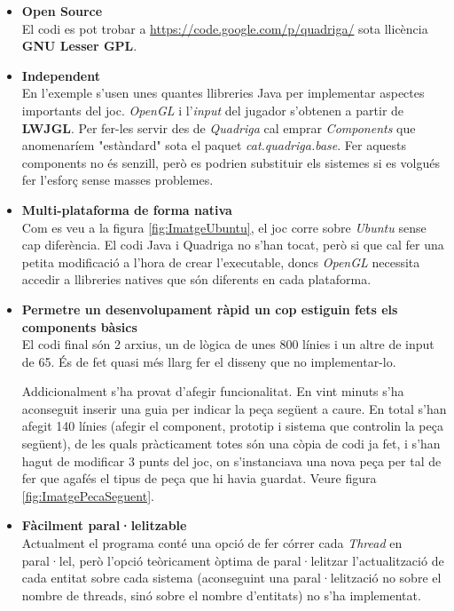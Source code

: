   \begin{itemize}
    \item {\bf Open Source} \hfill \\
      El codi es pot trobar a \url{https://code.google.com/p/quadriga/} sota llicència {\bf GNU Lesser GPL}.
      
    \item {\bf Independent} \hfill \\
      En l'exemple s'usen unes quantes llibreries Java per implementar aspectes importants del joc. {\em OpenGL} i l'{\em input} del jugador s'obtenen a partir de {\bf LWJGL}. Per fer-les servir des de {\em Quadriga} cal emprar {\em Components} que anomenaríem "estàndard" sota el paquet {\em cat.quadriga.base}. Fer aquests components no és senzill, però es podrien substituir els sistemes si es volgués fer l'esforç sense masses problemes.
      
    \item {\bf Multi-plataforma de forma nativa} \hfill \\
      Com es veu a la figura \ref{fig:ImatgeUbuntu}, el joc corre sobre {\em Ubuntu} sense cap diferència. El codi Java i Quadriga no s'han tocat, però si que cal fer una petita modificació a l'hora de crear l'executable, doncs {\em OpenGL} necessita accedir a llibreries natives que són diferents en cada plataforma.
      
    \item {\bf Permetre un desenvolupament ràpid un cop estiguin fets els components bàsics} \hfill \\
      El codi final són 2 arxius, un de lògica de unes 800 línies i un altre de input de 65. És de fet quasi més llarg fer el disseny que no implementar-lo.
      
      Addicionalment s'ha provat d'afegir funcionalitat. En vint minuts s'ha aconseguit inserir una guia per indicar la peça següent a caure. En total s'han afegit 140 línies (afegir el component, prototip i sistema que controlin la peça següent), de les quals pràcticament totes són una còpia de codi ja fet, i s'han hagut de modificar 3 punts del joc, on s'instanciava una nova peça per tal de fer que agafés el tipus de peça que hi havia guardat. Veure figura \ref{fig:ImatgePecaSeguent}.
      
    \item {\bf Fàcilment paral·lelitzable} \hfill \\
      Actualment el programa conté una opció de fer córrer cada {\em Thread} en paral·lel, però l'opció teòricament òptima de paral·lelitzar l'actualització de cada entitat sobre cada sistema (aconseguint una paral·lelització no sobre el nombre de threads, sinó sobre el nombre d'entitats) no s'ha implementat.
  \end{itemize}
    
